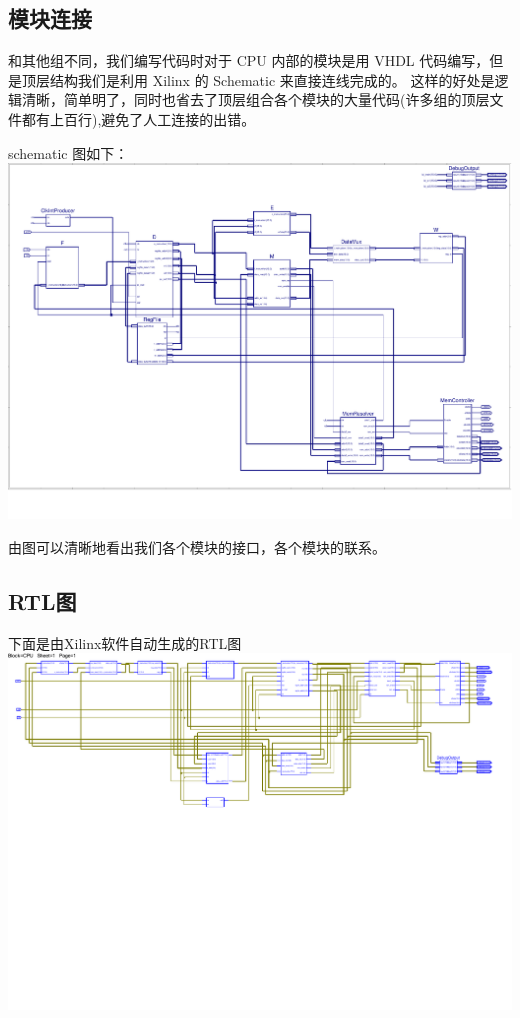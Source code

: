 \documentclass[10pt]{article}
\begin{document}
\begin{CJK}{UTF8}{gbsn}
\subsection{模块连接}
和其他组不同，我们编写代码时对于 CPU 内部的模块是用 VHDL 代码编写，但是顶层结构我们是利用 Xilinx 的 Schematic 来直接连线完成的。
这样的好处是逻辑清晰，简单明了，同时也省去了顶层组合各个模块的大量代码(许多组的顶层文件都有上百行),避免了人工连接的出错。

schematic 图如下：\\
\includegraphics[width=1.0\linewidth]{schematic.pdf}

由图可以清晰地看出我们各个模块的接口，各个模块的联系。

\subsection{RTL图}
下面是由Xilinx软件自动生成的RTL图\\
\includegraphics[width=1.0\linewidth,trim=0mm 5cm 0mm 0mm]{rtl.pdf}



\end{CJK}
\end{document}
